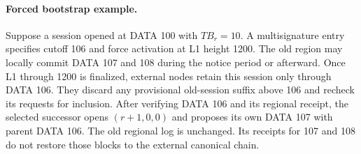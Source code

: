 \documentclass[11pt,a4paper]{article}
\begin{document}
\paragraph{Forced bootstrap example.}
Suppose a session opened at DATA 100 with $TB_r=10$. A multisignature
entry specifies cutoff 106 and force activation at L1 height 1200.
The old region may locally commit DATA 107 and 108 during the notice
period or afterward. Once L1 through 1200 is finalized, external nodes
retain this session only through DATA 106. They discard any provisional
old-session suffix above 106 and recheck its requests for inclusion.
After verifying DATA 106 and its regional receipt, the selected successor
opens $(r+1,0,0)$ and proposes its own DATA 107 with parent DATA 106.
The old regional log is unchanged. Its receipts for 107 and 108 do not
restore those blocks to the external canonical chain.
\end{document}
